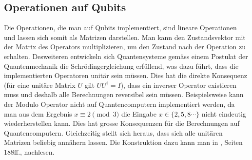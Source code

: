 
\subsection{Operationen auf Qubits}
Die Operationen, die man auf Qubits implementiert, sind lineare Operationen und lassen sich somit als Matrizen darstellen. Man kann den Zustandsvektor mit der Matrix des Operators multiplizieren, um den Zustand nach der Operation zu erhalten. Desweiteren entwickeln sich Quantensysteme gemäss einem Postulat der Quantenmechanik die Schrödingergleichung erfüllend, was dazu führt, dass die implementierten Operatoren unitär sein müssen. Dies hat die direkte Konsequenz (für eine unitäre Matrix $U$ gilt $UU^{\dagger} = I$), dass ein inverser Operator existieren muss und deshalb alle Berechnungen reversibel sein müssen. Beispielsweise kann der Modulo Operator nicht auf Quantencomputern implementiert werden, da man aus dem Ergebnis $x \equiv 2 \pmod{3}$ die Eingabe $x \in \{2, 5, 8\cdots\}$ nicht eindeutig wiederherstellen kann. Dies hat grosse Konsequenzen für die Berechnungen auf Quantencomputern. Gleichzeitig stellt sich heraus, dass sich alle unitären Matrizen beliebig annähern lassen. Die Konstruktion dazu kann man in \cite{QC}, Seiten 188ff., nachlesen.

